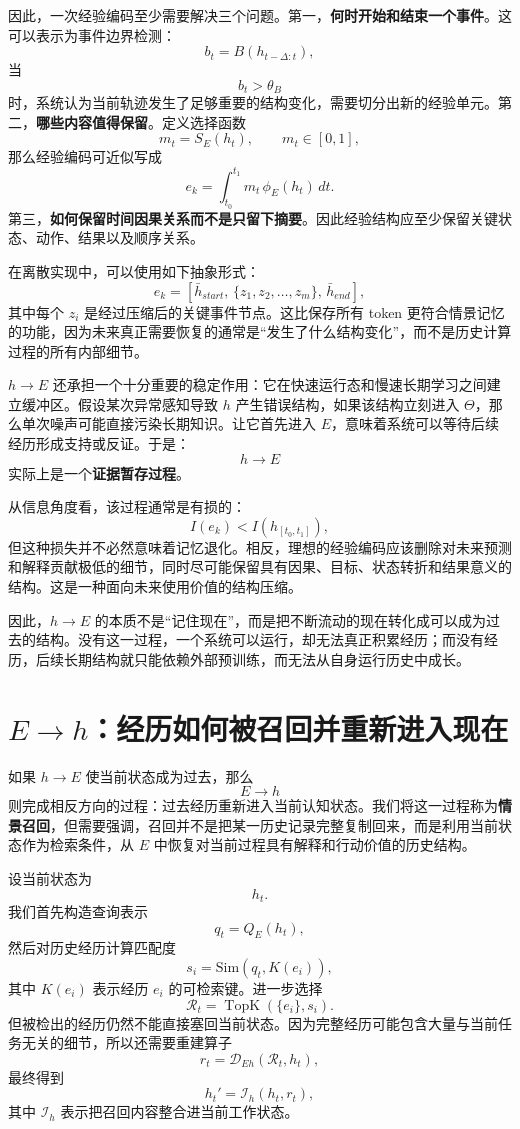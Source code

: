 因此，一次经验编码至少需要解决三个问题。第一，\textbf{何时开始和结束一个事件}。这可以表示为事件边界检测：
\[
b_t
=
B(h_{t-\Delta:t}),
\]
当
\[
b_t>\theta_B
\]
时，系统认为当前轨迹发生了足够重要的结构变化，需要切分出新的经验单元。第二，\textbf{哪些内容值得保留}。定义选择函数
\[
m_t
=
S_E(h_t),
\qquad
m_t\in[0,1],
\]
那么经验编码可近似写成
\[
e_k
=
\int_{t_0}^{t_1}
m_t\,\phi_E(h_t)\,dt.
\]
第三，\textbf{如何保留时间因果关系而不是只留下摘要}。因此经验结构应至少保留关键状态、动作、结果以及顺序关系。

在离散实现中，可以使用如下抽象形式：
\[
e_k
=
\left[
\bar h_{start},
\,
\{z_1,z_2,\ldots,z_m\},
\,
\bar h_{end}
\right],
\]
其中每个 $z_i$ 是经过压缩后的关键事件节点。这比保存所有 token 更符合情景记忆的功能，因为未来真正需要恢复的通常是“发生了什么结构变化”，而不是历史计算过程的所有内部细节。

$h\rightarrow E$ 还承担一个十分重要的稳定作用：它在快速运行态和慢速长期学习之间建立缓冲区。假设某次异常感知导致 $h$ 产生错误结构，如果该结构立刻进入 $\Theta$，那么单次噪声可能直接污染长期知识。让它首先进入 $E$，意味着系统可以等待后续经历形成支持或反证。于是：
\[
h\rightarrow E
\]
实际上是一个\textbf{证据暂存过程}。

从信息角度看，该过程通常是有损的：
\[
I(e_k)
<
I\left(
h_{[t_0,t_1]}
\right),
\]
但这种损失并不必然意味着记忆退化。相反，理想的经验编码应该删除对未来预测和解释贡献极低的细节，同时尽可能保留具有因果、目标、状态转折和结果意义的结构。这是一种面向未来使用价值的结构压缩。

因此，$h\rightarrow E$ 的本质不是“记住现在”，而是把不断流动的现在转化成可以成为过去的结构。没有这一过程，一个系统可以运行，却无法真正积累经历；而没有经历，后续长期结构就只能依赖外部预训练，而无法从自身运行历史中成长。

\section{$E\rightarrow h$：经历如何被召回并重新进入现在}

如果 $h\rightarrow E$ 使当前状态成为过去，那么
\[
\boxed{
E\rightarrow h
}
\]
则完成相反方向的过程：过去经历重新进入当前认知状态。我们将这一过程称为\textbf{情景召回}，但需要强调，召回并不是把某一历史记录完整复制回来，而是利用当前状态作为检索条件，从 $E$ 中恢复对当前过程具有解释和行动价值的历史结构。

设当前状态为
\[
h_t.
\]
我们首先构造查询表示
\[
q_t
=
Q_E(h_t),
\]
然后对历史经历计算匹配度
\[
s_i
=
\mathrm{Sim}
\left(
q_t,
K(e_i)
\right),
\]
其中 $K(e_i)$ 表示经历 $e_i$ 的可检索键。进一步选择
\[
\mathcal R_t
=
\operatorname{TopK}
\left(
\{e_i\},
s_i
\right).
\]
但被检出的经历仍然不能直接塞回当前状态。因为完整经历可能包含大量与当前任务无关的细节，所以还需要重建算子
\[
r_t
=
\mathcal{D}_{Eh}
\left(
\mathcal R_t,
h_t
\right),
\]
最终得到
\[
h_t'
=
\mathcal I_h(h_t,r_t),
\]
其中 $\mathcal I_h$ 表示把召回内容整合进当前工作状态。

